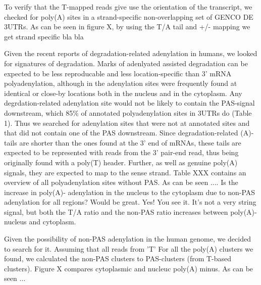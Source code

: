 \documentclass[a4paper]{article}
\begin{document}
To verify that the T-mapped reads give use the orientation of the transcript,
we checked for poly(A) sites in a strand-specific non-overlapping set of GENCO
DE 3UTRs. As can be seen in figure X, by using the T/A tail and +/- mapping we
get strand specific bla bla %

Given the recent reports of degradation-related adenylation in humans, we
looked for signatures of degradation. Marks of adenlyated assisted degradation
can be expected to be less reproducable and less location-specific than 3' mRNA
polyadenylation, although in \cite{} the adenylation sites were frequently
found at identical or close-by locations both in the nucleus and in the
cytoplasm. Any degrdation-related adenylation site would not be likely to
contain the PAS-signal downstream, which 85\% of annotated polyadenylation
sites in 3UTRs do (Table 1). Thus we searched for adenylation sites that were
not at annotated sites and that did not contain one of the PAS downstream.
Since degradation-related (A)-tails are shorter than the ones found at the 3'
end of mRNAs, these tails are expected to be represented with reads from the 3'
pair-end read, thus being originally found with a poly(T) header. Further, as
well as genuine poly(A) signals, they are expected to map to the sense strand.
Table XXX contains an overview of all polyadenylation sites without PAS. As can
be seen $\dots$. Is the increase in poly(A)- adenylation in the nucleus to the
cytoplasm due to non-PAS adenylation for all regions? Would be great. Yes! You
see it. It's not a very string signal, but both the T/A ratio and the non-PAS
ratio increases between poly(A)- nucleus and cytoplasm.

Given the possibility of non-PAS adenylation in the human genome, we decided to
search for it. Assuming that all reads from 'T' For all the poly(A) clusters we found, we calculated the non-PAS
clusters to PAS-clusters (from T-based clusters). Figure X compares cytoplasmic
and nucleuc poly(A) minus. As can be seen $\ldots$
\end{document}

